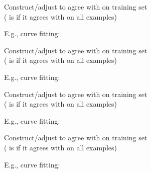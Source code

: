 \documentclass{article}
\begin{document}
\begin{huge}
\textwidth
{}


Construct/adjust  to agree with  on training set\\
( is  if it agrees with  on all examples)

E.g., curve fitting:

\vspace*{0.2in}

\textwidth
{}


Construct/adjust  to agree with  on training set\\
( is  if it agrees with  on all examples)

E.g., curve fitting:

\vspace*{0.2in}

\textwidth
{}


Construct/adjust  to agree with  on training set\\
( is  if it agrees with  on all examples)

E.g., curve fitting:

\vspace*{0.2in}

\textwidth
{}


Construct/adjust  to agree with  on training set\\
( is  if it agrees with  on all examples)

E.g., curve fitting:

\vspace*{0.2in}

\textwidth
{}


\end{huge}
\end{document}
